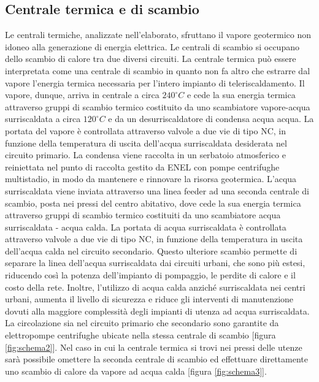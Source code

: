 \documentclass[laurea,oneside,11pt]{USiena_tesiLM}
\begin{document}
\subsection{Centrale termica e di scambio}
Le centrali termiche, analizzate nell'elaborato, sfruttano il vapore geotermico non idoneo alla generazione di energia elettrica. Le centrali di scambio si occupano dello scambio di calore tra due diversi circuiti. La centrale termica può essere interpretata come una centrale di scambio in quanto non fa altro che estrarre dal vapore l'energia termica necessaria per l'intero impianto di teleriscaldamento. Il vapore, dunque, arriva in centrale a circa $240 ^{\circ}C$ e cede la sua energia termica attraverso gruppi di scambio termico costituito da uno scambiatore vapore-acqua surriscaldata a circa $120 ^{\circ}C$ e da un desurriscaldatore di condensa acqua acqua. La portata del vapore è controllata attraverso  valvole a due vie di tipo NC, in funzione della temperatura  di uscita dell'acqua surriscaldata desiderata nel circuito primario. La condensa viene raccolta in un serbatoio atmosferico e reiniettata nel punto di raccolta gestito da ENEL con pompe centrifughe multistadio, in modo da mantenere e rinnovare la risorsa geotermica. L'acqua surriscaldata viene inviata attraverso una linea feeder ad una seconda centrale di scambio, posta nei pressi del centro abitativo, dove cede la sua energia termica attraverso gruppi di scambio termico costituiti da uno scambiatore acqua surriscaldata - acqua calda. La portata di acqua surriscaldata è controllata attraverso valvole a due vie di tipo NC, in funzione della temperatura in uscita dell'acqua calda nel circuito secondario. Questo ulteriore scambio permette di separare la linea dell'acqua surriscaldata  dai circuiti urbani, che sono più estesi, riducendo così la potenza dell'impianto di pompaggio, le perdite di calore e il costo della rete. Inoltre, l'utilizzo di acqua calda anziché surriscaldata nei centri urbani, aumenta il livello di sicurezza e riduce gli interventi di manutenzione dovuti alla maggiore complessità degli impianti di utenza ad acqua surriscaldata. La circolazione sia nel circuito primario che secondario sono garantite da elettropompe centrifughe ubicate nella stessa centrale di scambio [figura \ref{fig:schema2}].
Nel caso in cui la centrale termica si trovi nei pressi delle utenze sarà possibile omettere la seconda centrale di scambio ed effettuare direttamente uno scambio di calore da vapore ad acqua calda [figura \ref{fig:schema3}].
\end{document}
